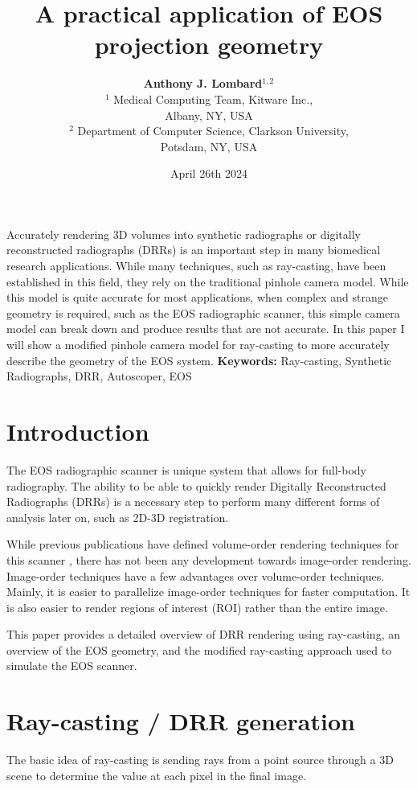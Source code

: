 \documentclass[12pt,twocolumn]{article}
\title{\bf \Huge A practical application of EOS\textregistered{} projection geometry}
\author{{\bf \Large Anthony J. Lombard$^{1,2}$}\\
  $^1$ Medical Computing Team, Kitware Inc.,\\
  Albany, NY, USA\\
  $^2$ Department of Computer Science, Clarkson University,\\ 
  Potsdam, NY, USA
  }
\date{April 26th 2024}
\begin{document}
\maketitle

Accurately rendering 3D volumes into synthetic radiographs or digitally reconstructed radiographs (DRRs) 
is an important step in many biomedical research applications. While many techniques, such as ray-casting, have been 
established in this field, they rely on the traditional pinhole camera model. While this model is quite accurate for 
most applications, when complex and strange geometry is required, such as the EOS\textregistered{} radiographic 
scanner, this simple camera model can break down and produce results that are not accurate. In this paper I will show 
a modified pinhole camera model for ray-casting to more accurately describe the geometry of the EOS\textregistered{} 
system.
\noindent
{\bf Keywords:} Ray-casting, Synthetic Radiographs, DRR, Autoscoper, EOS\textregistered{}

\section{Introduction}

The EOS\textregistered{} radiographic scanner is unique system that allows for full-body radiography. 
The ability to be able to quickly render Digitally Reconstructed Radiographs (DRRs) is a necessary step to perform
many different forms of analysis later on, such as 2D-3D registration. 

While previous publications have defined volume-order rendering techniques for this scanner \cite{groisser2019geometry},
there has not been any development towards image-order rendering. Image-order techniques have a few advantages over 
volume-order techniques. Mainly, it is easier to parallelize image-order techniques for faster computation. It is also 
easier to render regions of interest (ROI) rather than the entire image.

This paper provides a detailed overview of DRR rendering using ray-casting, an overview of the EOS\textregistered{} 
geometry, and the modified ray-casting approach used to simulate the EOS\textregistered{} scanner.

\section{Ray-casting / DRR generation}
The basic idea of ray-casting is sending rays from a point source through a 3D scene to determine the value at each 
pixel in the final image. 
\end{document}
